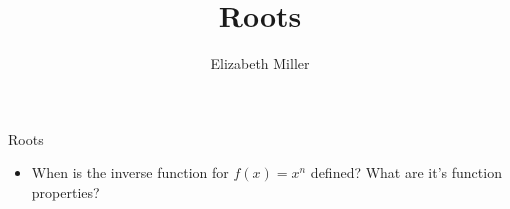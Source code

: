 \documentclass{ximera}
\author{Elizabeth Miller}
\title{Roots}
\begin{document}
\begin{abstract}
\end{abstract}
\maketitle


\begin{objectives}

\item Roots
\begin{itemize}
	\item When is the inverse function for $f(x)=x^n$ defined?  What are it's function properties?
\end{itemize}




\end{objectives}
\end{document}

